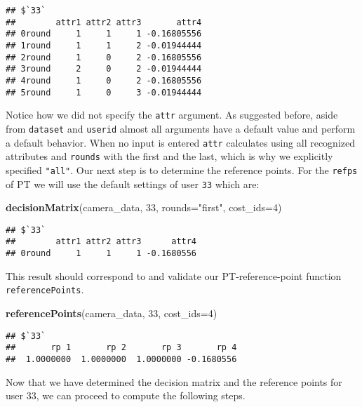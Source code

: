 \documentclass[]{article}
\newenvironment{Shaded}{\begin{snugshade}}{\end{snugshade}}
\newcommand{\KeywordTok}[1]{\textcolor[rgb]{0.13,0.29,0.53}{\textbf{{#1}}}}
\newcommand{\DataTypeTok}[1]{\textcolor[rgb]{0.13,0.29,0.53}{{#1}}}
\newcommand{\DecValTok}[1]{\textcolor[rgb]{0.00,0.00,0.81}{{#1}}}
\newcommand{\StringTok}[1]{\textcolor[rgb]{0.31,0.60,0.02}{{#1}}}
\newcommand{\NormalTok}[1]{{#1}}
\begin{document}
\begin{verbatim}
## $`33`
##        attr1 attr2 attr3       attr4
## 0round     1     1     1 -0.16805556
## 1round     1     1     2 -0.01944444
## 2round     1     0     2 -0.16805556
## 3round     2     0     2 -0.01944444
## 4round     1     0     2 -0.16805556
## 5round     1     0     3 -0.01944444
\end{verbatim}

Notice how we did not specify the \texttt{attr} argument. As suggested
before, aside from \texttt{dataset} and \texttt{userid} almost all
arguments have a default value and perform a default behavior. When no
input is entered \texttt{attr} calculates using all recognized
attributes and \texttt{rounds} with the first and the last, which is why
we explicitly specified \texttt{"all"}. Our next step is to determine
the reference points. For the \texttt{refps} of PT we will use the
default settings of user \texttt{33} which are:

\begin{Shaded}
\begin{Highlighting}[]
\KeywordTok{decisionMatrix}\NormalTok{(camera_data, }\DecValTok{33}\NormalTok{, }\DataTypeTok{rounds=}\StringTok{"first"}\NormalTok{, }\DataTypeTok{cost_ids=}\DecValTok{4}\NormalTok{)}
\end{Highlighting}
\end{Shaded}

\begin{verbatim}
## $`33`
##        attr1 attr2 attr3      attr4
## 0round     1     1     1 -0.1680556
\end{verbatim}

This result should correspond to and validate our PT-reference-point
function \texttt{referencePoints}.

\begin{Shaded}
\begin{Highlighting}[]
\KeywordTok{referencePoints}\NormalTok{(camera_data, }\DecValTok{33}\NormalTok{, }\DataTypeTok{cost_ids=}\DecValTok{4}\NormalTok{)}
\end{Highlighting}
\end{Shaded}

\begin{verbatim}
## $`33`
##       rp 1       rp 2       rp 3       rp 4 
##  1.0000000  1.0000000  1.0000000 -0.1680556
\end{verbatim}

Now that we have determined the decision matrix and the reference points
for user 33, we can proceed to compute the following steps.
\end{document}

